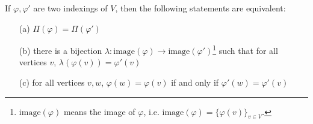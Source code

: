 \documentclass[11pt,a4paper]{article}
\numberwithin{equation}{section}
\newcommand{\idx}{\varphi}
\newcommand{\image}{\mathrm{image}}
\begin{document}
\begin{theoremrep}
    If $\idx,\idx'$ are two indexings of $V$, then the following statements are equivalent:
    \begin{enumerate}
        \item[(a)] $\Pi(\idx)=\Pi(\idx')$
        \item[(b)] there is a bijection $\lambda : \image(\idx) \rightarrow \image(\idx')$\footnote{$\image(\idx)$ means the image of $\idx$, i.e. $\image(\idx)=\{ \idx(v) \}_{v \in V}$.} such that for all vertices $v$, $\lambda(\idx(v)) = \idx'(v)$
        \item[(c)] for all vertices $v,w$, $\idx(w) = \idx(v)$ if and only if $\idx'(w) = \idx'(v)$
    \end{enumerate} \label{theorem:equal_indexings}
\end{theoremrep}
\end{document}
